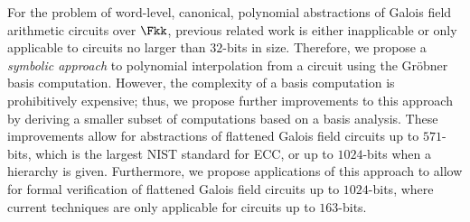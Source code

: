 For the problem of word-level, canonical, polynomial abstractions
of Galois field arithmetic circuits over $\Fkk$, previous related work 
is either inapplicable or only applicable to circuits no larger than
$32$-bits in size.
Therefore, we propose a {\it symbolic approach} to
polynomial interpolation from a circuit using the Gr\"obner basis
computation. However, the complexity of a \Grobner basis computation is 
prohibitively expensive; thus, we propose further improvements to this 
approach by deriving a smaller subset of computations based on a \Grobner
basis analysis. These improvements allow for abstractions of 
flattened Galois field circuits up to $571$-bits, which is the largest NIST 
standard for ECC, or up to $1024$-bits when a hierarchy is given. 
Furthermore, we propose applications of this 
approach to allow for formal verification of flattened Galois field circuits up to 
$1024$-bits, where current techniques are only applicable for circuits up 
to $163$-bits.
